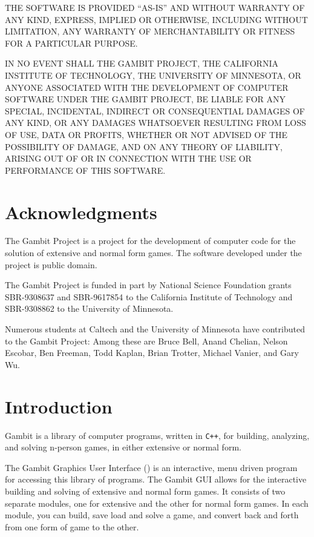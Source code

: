 THE SOFTWARE IS PROVIDED ``AS-IS'' AND WITHOUT WARRANTY OF ANY KIND, EXPRESS, IMPLIED OR 
OTHERWISE, INCLUDING WITHOUT LIMITATION, ANY WARRANTY OF MERCHANTABILITY OR FITNESS FOR A 
PARTICULAR PURPOSE.
 
IN NO EVENT SHALL THE GAMBIT PROJECT, THE CALIFORNIA INSTITUTE OF TECHNOLOGY, THE UNIVERSITY 
OF MINNESOTA, OR ANYONE ASSOCIATED WITH THE DEVELOPMENT OF COMPUTER SOFTWARE UNDER THE GAMBIT 
PROJECT, BE LIABLE FOR ANY SPECIAL, INCIDENTAL, INDIRECT OR CONSEQUENTIAL DAMAGES OF ANY KIND, 
OR ANY DAMAGES WHATSOEVER RESULTING FROM LOSS OF USE, DATA OR PROFITS, WHETHER OR NOT ADVISED 
OF THE POSSIBILITY OF DAMAGE, AND ON ANY THEORY OF LIABILITY, ARISING OUT OF OR IN CONNECTION 
WITH THE USE OR PERFORMANCE OF THIS SOFTWARE.


\chapter*{Acknowledgments}%

The Gambit Project is a project for the development of computer code for the 
solution of extensive and normal form games.  The software developed under 
the project is public domain.  

The Gambit Project is funded in part by 
National Science Foundation grants SBR-9308637 and SBR-9617854 
to the California Institute 
of Technology and SBR-9308862 to the University of Minnesota.  

Numerous students at Caltech and the University of Minnesota have contributed 
to the Gambit Project:  Among these are Bruce Bell,  Anand Chelian, Nelson 
Escobar, Ben Freeman, Todd Kaplan, Brian Trotter, Michael Vanier, and Gary Wu. 

\chapter{Introduction}

Gambit is a library of computer programs, written
in \verb$C++$, for building, analyzing, and solving n-person games, in
either extensive or normal form.

The Gambit Graphics User Interface () is an
interactive, menu driven program for accessing this library of programs.
The Gambit GUI allows for the interactive building and solving of
extensive and normal form games.  It consists of two separate modules, one
for extensive and the other for normal form games.   In each module, you
can build, save load and solve a game, and convert back and forth from one
form of game to the other.

